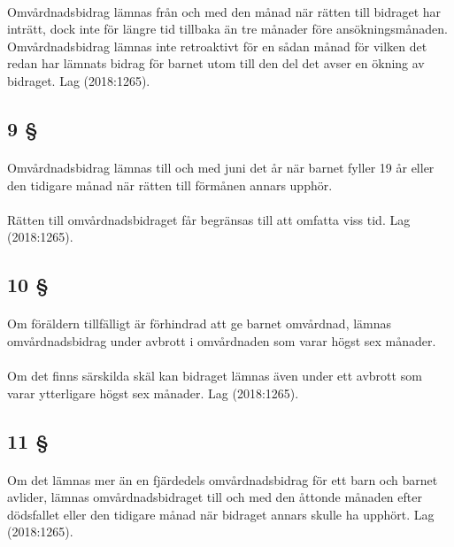 \documentclass[a4paper,notitlepage,openany,10pt]{book}
\begin{document}
\paragraph*{}
Omvårdnadsbidrag lämnas från och med den månad när rätten till bidraget har inträtt, dock inte för längre tid tillbaka än tre månader före ansökningsmånaden. Omvårdnadsbidrag lämnas inte retroaktivt för en sådan månad för vilken det redan har lämnats bidrag för barnet utom till den del det avser en ökning av bidraget.
Lag (2018:1265).
\subsection*{9 §}
\paragraph*{}
Omvårdnadsbidrag lämnas till och med juni det år när barnet fyller 19 år eller den tidigare månad när rätten till förmånen annars upphör.
\paragraph*{}
Rätten till omvårdnadsbidraget får begränsas till att omfatta viss tid.
Lag (2018:1265).
\subsection*{10 §}
\paragraph*{}
Om föräldern tillfälligt är förhindrad att ge barnet omvårdnad, lämnas omvårdnadsbidrag under avbrott i omvårdnaden som varar högst sex månader.
\paragraph*{}
Om det finns särskilda skäl kan bidraget lämnas även under ett avbrott som varar ytterligare högst sex månader.
Lag (2018:1265).
\subsection*{11 §}
\paragraph*{}
Om det lämnas mer än en fjärdedels omvårdnadsbidrag för ett barn och barnet avlider, lämnas omvårdnadsbidraget till och med den åttonde månaden efter dödsfallet eller den tidigare månad när bidraget annars skulle ha upphört.
Lag (2018:1265).
\end{document}
